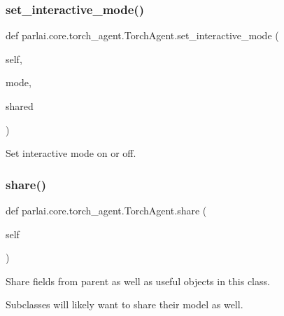 \subsubsection{\texorpdfstring{set\+\_\+interactive\+\_\+mode()}{set\_interactive\_mode()}}
{\footnotesize\ttfamily def parlai.\+core.\+torch\+\_\+agent.\+Torch\+Agent.\+set\+\_\+interactive\+\_\+mode (\begin{DoxyParamCaption}\item[{}]{self,  }\item[{}]{mode,  }\item[{}]{shared }\end{DoxyParamCaption})}

\begin{DoxyVerb}Set interactive mode on or off.
\end{DoxyVerb}
 \mbox{\label{classparlai_1_1core_1_1torch__agent_1_1TorchAgent_a373f0e276bf7c9d914a4e3363e9c2712}} 
\subsubsection{\texorpdfstring{share()}{share()}}
{\footnotesize\ttfamily def parlai.\+core.\+torch\+\_\+agent.\+Torch\+Agent.\+share (\begin{DoxyParamCaption}\item[{}]{self }\end{DoxyParamCaption})}

\begin{DoxyVerb}Share fields from parent as well as useful objects in this class.

Subclasses will likely want to share their model as well.
\end{DoxyVerb}
 \mbox{\label{classparlai_1_1core_1_1torch__agent_1_1TorchAgent_a9f89e606931a4622a5c6a6f6b832235c}} 
